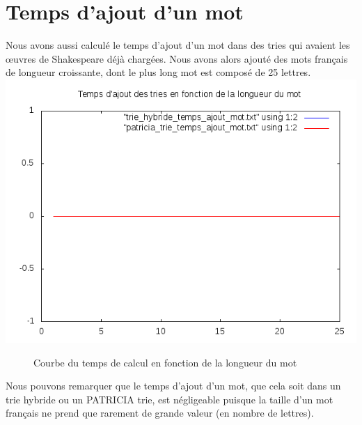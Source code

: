 \documentclass[a4paper,12pt]{report}
\begin{document}
\section{Temps d'ajout d'un mot}
Nous avons aussi calculé le temps d'ajout d'un mot dans des tries qui avaient les œuvres de Shakespeare déjà chargées. Nous avons alors
ajouté des mots français de longueur croissante, dont le plus long mot est composé de 25 lettres.\\
\includegraphics{../comparaison/courbe_ajout_mot.png}
\begin{figure}[!htbp]
\caption{Courbe du temps de calcul en fonction de la longueur du mot}
\end{figure}

Nous pouvons remarquer que le temps d'ajout d'un mot, que cela soit dans un trie hybride ou un PATRICIA trie, est négligeable
puisque la taille d'un mot français ne prend que rarement de grande valeur (en nombre de lettres).
\end{document}
